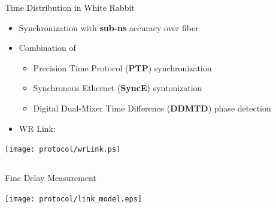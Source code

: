 \documentclass[compress,red]{beamer}
\begin{document}
\begin{frame}{Time Distribution in White Rabbit}

  \begin{itemize}
    \item Synchronization with {\bf sub-ns} accuracy over fiber
    \item Combination of
	\begin{itemize}
	  \item Precision Time Protocol ({\bf PTP}) synchronization
	  \item Synchronous Ethernet ({\bf SyncE}) syntonization
	  \item Digital Dual-Mixer Time Difference ({\bf DDMTD}) phase detection
	\end{itemize}
    \item WR Link:
  \end{itemize}

  \begin{center}
  \texttt{[image: protocol/wrLink.ps]}
  \end{center}

\end{frame}

\subsection{}
\begin{frame}{Fine Delay Measurement}

  \begin{center}
  \texttt{[image: protocol/link\_model.eps]}
  \end{center}

\end{frame}
\end{document}
